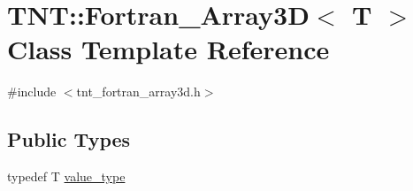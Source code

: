 \hypertarget{classTNT_1_1Fortran__Array3D}{\section{T\-N\-T\-:\-:Fortran\-\_\-\-Array3\-D$<$ T $>$ Class Template Reference}
\label{classTNT_1_1Fortran__Array3D}
}


{\ttfamily \#include $<$tnt\-\_\-fortran\-\_\-array3d.\-h$>$}

\subsection*{Public Types}
\begin{DoxyCompactItemize}
\item 
typedef T \hyperlink{classTNT_1_1Fortran__Array3D_ac63354327521c0974bb45a9b02a9ff40}{value\-\_\-type}
\end{DoxyCompactItemize}
